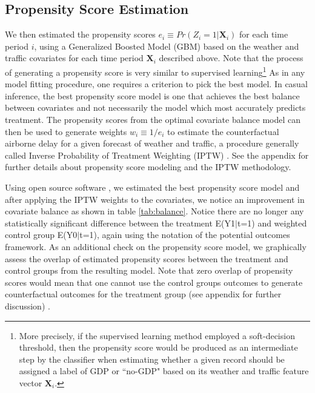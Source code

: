 \documentclass[conference]{IEEEtran}
\begin{document}
\subsection{Propensity Score Estimation}
We then estimated the propensity scores $e_i \equiv Pr(Z_i=1|\mathbf{X}_i)$ for each time period $i$, using a Generalized Boosted Model (GBM) \cite{ridgeway2015toolkit} based on the weather and traffic covariates for each time period $\mathbf{X}_i$ described above.  Note that the process of generating a propensity score is very similar to supervised learning\footnote{More precisely, if the supervised learning method employed a soft-decision threshold, then the propensity score would be produced as an intermediate step by the classifier when estimating whether a given record should be assigned a label of GDP or ``no-GDP" based on its weather and traffic feature vector $\mathbf{X}_i$.} As in any model fitting procedure, one requires a criterion to pick the best model.  In casual inference, the best propensity score model is one that achieves the best balance between covariates and not necessarily the model which most accurately predicts treatment. The propensity scores from the optimal covariate balance model can then be used to generate weights $w_i \equiv 1/e_i$ to estimate the counterfactual airborne delay for a given forecast of weather and traffic, a procedure generally called Inverse Probability of Treatment Weighting (IPTW) \cite{austin2011introduction}.  See the appendix for further details about propensity score modeling and the IPTW methodology.  

Using open source software \cite{ridgeway2015toolkit}, we estimated the best propensity score model and after applying the IPTW weights to the covariates, we notice an improvement in covariate balance as shown in table \ref{tab:balance}. Notice there are no longer any statistically significant difference between the treatment E(Y1$|$t=1) and weighted control group E(Y0$|$t=1), again using the notation of the potential outcomes framework.  As an additional check on the propensity score model, we graphically assess the overlap of estimated propensity scores between the treatment and control groups from the resulting model.  Note that zero overlap of propensity scores would mean that one cannot use the control groups outcomes to generate counterfactual outcomes for the treatment group (see appendix for further discussion) \cite{austin2011tutorial}. 
\end{document}

